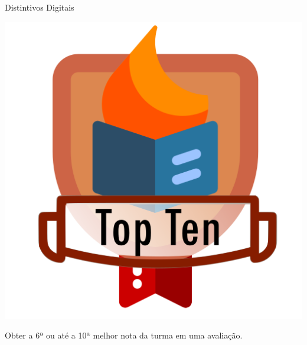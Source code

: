 \documentclass[xcolor=dvipsnames,table]{beamer}
\begin{document}
	\begin{frame}{Distintivos Digitais}
		\begin{block}{}
			\begin{center}
	    		\includegraphics[height=.65\textheight]{images/badges/top-ten.png}
	  		\end{center}		
	  		Obter a 6ª ou até a 10ª melhor nota da turma em uma avaliação. 
		\end{block}
	\end{frame}
	
\end{document}
